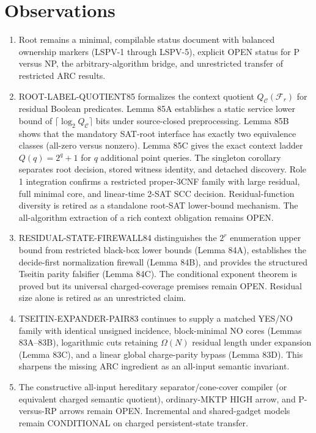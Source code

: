 \documentclass[11pt]{article}
\begin{document}
\section{Observations}
\begin{enumerate}
\item Root  remains a minimal, compilable status document with balanced ownership markers (LSPV-1 through LSPV-5), explicit OPEN status for P versus NP, the arbitrary-algorithm bridge, and unrestricted transfer of restricted ARC results.
\item ROOT-LABEL-QUOTIENT85 formalizes the context quotient $Q_{\mathcal C}(\mathcal F_r)$ for residual Boolean predicates. Lemma 85A establishes a static service lower bound of $\lceil\log_2 Q_{\mathcal C}\rceil$ bits under source-closed preprocessing. Lemma 85B shows that the mandatory SAT-root interface has exactly two equivalence classes (all-zero versus nonzero). Lemma 85C gives the exact context ladder $Q(q)=2^q+1$ for $q$ additional point queries. The singleton corollary separates root decision, stored witness identity, and detached discovery. Role 1 integration confirms a restricted proper-3CNF family with large residual, full minimal core, and linear-time 2-SAT SCC decision. Residual-function diversity is retired as a standalone root-SAT lower-bound mechanism. The all-algorithm extraction of a rich context obligation remains OPEN.
\item RESIDUAL-STATE-FIREWALL84 distinguishes the $2^r$ enumeration upper bound from restricted black-box lower bounds (Lemma 84A), establishes the decide-first normalization firewall (Lemma 84B), and provides the structured Tseitin parity falsifier (Lemma 84C). The conditional exponent theorem is proved but its universal charged-coverage premises remain OPEN. Residual size alone is retired as an unrestricted claim.
\item TSEITIN-EXPANDER-PAIR83 continues to supply a matched YES/NO family with identical unsigned incidence, block-minimal NO cores (Lemmas 83A--83B), logarithmic cuts retaining $\Omega(N)$ residual length under expansion (Lemma 83C), and a linear global charge-parity bypass (Lemma 83D). This sharpens the missing ARC ingredient as an all-input semantic invariant.
\item The constructive all-input hereditary separator/cone-cover compiler (or equivalent charged semantic quotient), ordinary-MKTP HIGH arrow, and P-versus-RP arrows remain OPEN. Incremental and shared-gadget models remain CONDITIONAL on charged persistent-state transfer.

\end{enumerate}
\end{document}
